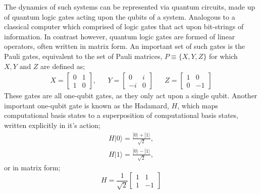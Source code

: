 The dynamics of such systems can be represented via quantum circuits, made up of quantum logic gates acting
upon the qubits of a system. Analogous to a classical computer which comprised of logic gates that act upon
bit-strings of information. In contrast however, quantum logic gates are formed of linear operators, often
written in matrix form. An important set of such gates is the Pauli gates, equivalent to the set of Pauli
matrices, $P \equiv \{X, Y, Z\}$ for which $X, Y \text{ and } Z$ are defined as;
\begin{align*}
    X = \begin{bmatrix}
            0 & 1 \\
            1 & 0
        \end{bmatrix},
     &  &
    Y = \begin{bmatrix}
            0  & i \\
            -i & 0
        \end{bmatrix}
     &  &
    Z = \begin{bmatrix}
            1 & 0  \\
            0 & -1
        \end{bmatrix}
\end{align*}
These gates are all one-qubit gates, as they only act upon a single qubit. Another important one-qubit gate is
known as the Hadamard, $H$, which maps computational basis states to a superposition of computational basis states,
written explicitly in it's action;
\begin{align*}
    H |0\rangle = \frac{|0\rangle + |1\rangle}{\sqrt{2}}, \\
    H |1\rangle = \frac{|0\rangle - |1\rangle}{\sqrt{2}},
\end{align*}
or in matrix form;
\begin{equation*}
    H = \frac{1}{\sqrt{2}} \begin{bmatrix}
        1 & 1  \\
        1 & -1
    \end{bmatrix}
\end{equation*}








